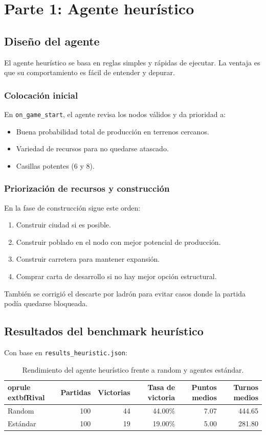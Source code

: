 \documentclass[11pt,spanish,listoffigures,listoftables]{tfgetsinf}
\begin{document}
\chapter{Parte 1: Agente heurístico}

\section{Diseño del agente}
El agente heurístico se basa en reglas simples y rápidas de ejecutar. La ventaja es que su comportamiento es fácil de entender y depurar.

\subsection{Colocación inicial}
En \texttt{on\_game\_start}, el agente revisa los nodos válidos y da prioridad a:
\begin{itemize}
  \item Buena probabilidad total de producción en terrenos cercanos.
  \item Variedad de recursos para no quedarse atascado.
  \item Casillas potentes (6 y 8).
\end{itemize}

\subsection{Priorización de recursos y construcción}
En la fase de construcción sigue este orden:
\begin{enumerate}
  \item Construir ciudad si es posible.
  \item Construir poblado en el nodo con mejor potencial de producción.
  \item Construir carretera para mantener expansión.
  \item Comprar carta de desarrollo si no hay mejor opción estructural.
\end{enumerate}

También se corrigió el descarte por ladrón para evitar casos donde la partida podía quedarse bloqueada.

\section{Resultados del benchmark heurístico}
Con base en \texttt{results\_heuristic.json}:

\begin{table}[H]
\centering
\small
\begin{tabular}{lrrrrr}
  oprule
  extbf{Rival} & \textbf{Partidas} & \textbf{Victorias} & \textbf{Tasa de victoria} & \textbf{Puntos medios} & \textbf{Turnos medios} \\
\midrule
Random & 100 & 44 & 44.00\% & 7.07 & 444.65 \\
Estándar & 100 & 19 & 19.00\% & 5.00 & 281.80 \\
\bottomrule
\end{tabular}
\caption{Rendimiento del agente heurístico frente a random y agentes estándar.}
\label{tab:heuristic_results}
\end{table}
\end{document}
